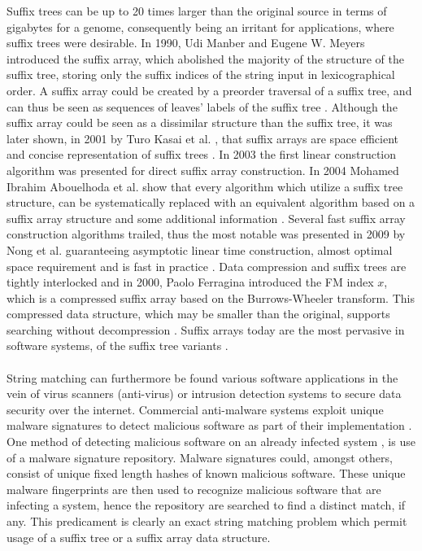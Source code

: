 \documentclass[12pt]{article} %
\begin{document}
Suffix trees can be up to 20 times larger than the original source in terms of gigabytes for a genome, consequently being an irritant for applications, where suffix trees were desirable.  In 1990, Udi Manber and Eugene W. Meyers introduced the suffix array, which abolished the majority of the structure of the suffix tree, storing only the suffix indices of the string input in lexicographical order. A suffix array could be created by a preorder traversal of a suffix tree, and can thus be seen as sequences of leaves’ labels of the suffix tree \cite{ apostolico201640}. Although the suffix array could be seen as a dissimilar structure than the suffix tree, it was later shown, in 2001 by Turo Kasai et al. \cite{ apostolico201640}, that suffix arrays are space efficient and concise representation of suffix trees  \cite{ apostolico201640, gusfield}. In 2003 the first linear construction algorithm was presented for direct suffix array construction. In 2004 Mohamed Ibrahim Abouelhoda et al. \cite{enchancedsuffix} show that every algorithm which utilize a suffix tree structure, can be systematically replaced with an equivalent algorithm based on a suffix array structure and  some additional information \cite{enchancedsuffix}. Several fast suffix array construction algorithms trailed, thus the most notable was presented in 2009 by Nong et al. guaranteeing asymptotic linear time construction, almost optimal space requirement and is fast in practice \cite{newapproach, twoeffecient, apostolico201640}. Data compression and suffix trees are tightly interlocked and in 2000, Paolo Ferragina introduced the FM index $x$, which is a compressed suffix array based on the Burrows-Wheeler transform. This compressed data structure, which may be smaller than the original, supports searching without decompression \cite{apostolico201640}. Suffix arrays today are the most pervasive in software systems, of the suffix tree variants \cite{apostolico201640}.  \\ \\
String matching can furthermore be found various software applications in the vein of virus scanners (anti-virus) or intrusion detection systems to secure data security over the internet. Commercial anti-malware systems exploit unique malware signatures to detect malicious software as part of their implementation \cite{kruegel2003using, detection}. One method of detecting malicious software on an already infected system , is use of a malware signature repository.  Malware signatures could, amongst others, consist of unique fixed length hashes of known malicious software. These unique malware fingerprints are then used to recognize malicious software that are infecting  a system, hence the repository are searched to find a distinct match, if any. This predicament is clearly an exact string matching problem which permit usage of a suffix tree or a suffix array data structure. 
\end{document}
